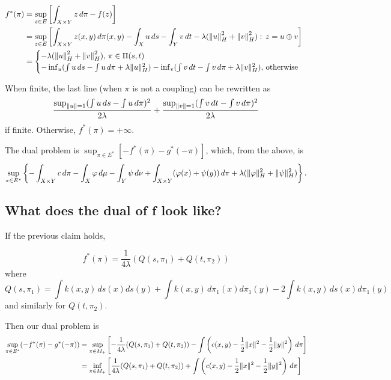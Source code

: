 \begin{align*}
f^{*}(\pi) &= \sup_{z\in E} \left[ \int_{X\times Y} z\,d\pi - f(z)\right] \\
&= \sup_{z\in E} \left[ \int_{X\times Y} z(x,y)\,d\pi(x,y) - \int_X u\,ds - \int_Y v\,dt - \lambda(\left\|u\right\|_H^2 + \left\|v\right\|_H^2) :\, z= u\oplus v \right] \\
&= \begin{cases}
- \lambda(\left\|u\right\|_H^2 + \left\|v\right\|_H^2), \, \pi\in \Pi(s,t) \\
-\inf_u (\int u\,ds - \int u\,d\pi + \lambda \lVert u\rVert_H^2) - \inf_v (\int v\,dt - \int v\,d\pi + \lambda \lVert v\rVert_H^2), \, \textrm{otherwise}
\end{cases}
\end{align*}

When finite, the last line (when $\pi$ is not a coupling) can be rewritten as
$$\frac{\sup_{\lVert u\rVert=1} (\int u\,ds - \int u\,d\pi)^2}{2\lambda} + \frac{\sup_{\lVert v\rVert=1}(\int v\,dt - \int v\,d\pi)^2}{2\lambda}$$ if finite. Otherwise, $f^{*}(\pi)=+\infty$.

The dual problem is $\sup_{\pi\in E^{*}} \left[ -f^{*}(\pi)-g^{*}(-\pi)\right] $, which, from the above, is
$$ \sup_{\pi\in E^{*}} \left\lbrace - \int_{X\times Y} c\,d\pi - \int_X \varphi\,d\mu - \int_Y \psi\,d\nu + \int_{X\times Y} (\varphi(x)+\psi(y))\,d\pi + \lambda(\lVert\varphi\rVert_H^2+\lVert\psi\rVert_H^2)\right\rbrace . $$

\subsection{What does the dual of f look like?}

If the previous claim holds,

$$
f^{*}(\pi) = \frac{1}{4\lambda} \left(Q(s,\pi_1) + Q(t,\pi_2)\right)
$$ where $$Q(s,\pi_1) = \int k(x,y)\,ds(x) ds(y) + \int k(x,y)\,d\pi_1(x) d\pi_1(y) - 2 \int k(x,y)\,ds(x)d\pi_1(y)$$ and similarly for $Q(t,\pi_2)$.

Then our dual problem is
\begin{align*}
\sup_{\pi\in E^{*}}(-f^{*}(\pi) - g^{*}(-\pi)) &= \sup_{\pi\in M_{+}} \left[ -\frac{1}{4\lambda} (Q(s,\pi_1)+Q(t,\pi_2)) - \int \left( c(x,y) - \frac{1}{2}\lVert x\rVert^2 - \frac{1}{2}\lVert y\rVert^2 \right)\,d\pi \right] \\
&= \inf_{\pi\in M_{+}} \left[ \frac{1}{4\lambda} (Q(s,\pi_1)+Q(t,\pi_2)) + \int \left( c(x,y) - \frac{1}{2}\lVert x\rVert^2 - \frac{1}{2}\lVert y\rVert^2 \right)\,d\pi \right]
\end{align*}


